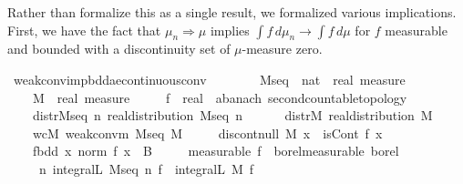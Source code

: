 \documentclass[leqno]{article}
\theoremstyle{definition}
\begin{document}
Rather than formalize this as a single result, we formalized various implications. First, we have the fact that $\mu_n \Rightarrow \mu$ implies $\int f \, d\mu_n \rightarrow \int f \, d\mu$ for $f$ measurable and bounded with a discontinuity set of $\mu$-measure zero.

\medskip

\begin{isabellebody}
\isamarkupfalse%
\ weak{\isacharunderscore}conv{\isacharunderscore}imp{\isacharunderscore}bdd{\isacharunderscore}ae{\isacharunderscore}continuous{\isacharunderscore}conv{\isacharcolon}\isanewline
\ \ \ \isanewline
\ \ \ \ M{\isacharunderscore}seq\ {\isacharcolon}{\isacharcolon}\ {\isachardoublequoteopen}nat\ {\isasymRightarrow}\ real\ measure{\isachardoublequoteclose}\ \isanewline
\ \ \ \ M\ {\isacharcolon}{\isacharcolon}\ {\isachardoublequoteopen}real\ measure{\isachardoublequoteclose}\ \isanewline
\ \ \ \ f\ {\isacharcolon}{\isacharcolon}\ {\isachardoublequoteopen}real\ {\isasymRightarrow}\ {\isacharprime}a{\isacharcolon}{\isacharcolon}{\isacharbraceleft}banach{\isacharcomma}\ second{\isacharunderscore}countable{\isacharunderscore}topology{\isacharbraceright}{\isachardoublequoteclose}\isanewline
\ \ \ \isanewline
\ \ \ \ distr{\isacharunderscore}M{\isacharunderscore}seq{\isacharcolon}\ {\isachardoublequoteopen}{\isasymAnd}n{\isachardot}\ real{\isacharunderscore}distribution\ {\isacharparenleft}M{\isacharunderscore}seq\ n{\isacharparenright}{\isachardoublequoteclose}\ \ \isanewline
\ \ \ \ distr{\isacharunderscore}M{\isacharcolon}\ {\isachardoublequoteopen}real{\isacharunderscore}distribution\ M{\isachardoublequoteclose}\ \ \isanewline
\ \ \ \ wcM{\isacharcolon}\ {\isachardoublequoteopen}weak{\isacharunderscore}conv{\isacharunderscore}m\ M{\isacharunderscore}seq\ M{\isachardoublequoteclose}\ \isanewline
\ \ \ \ discont{\isacharunderscore}null{\isacharcolon}\ {\isachardoublequoteopen}M\ {\isacharparenleft}{\isacharbraceleft}x{\isachardot}\ {\isasymnot}\ isCont\ f\ x{\isacharbraceright}{\isacharparenright}\ {\isacharequal}\ {}{\isachardoublequoteclose}\ \isanewline
\ \ \ \ f{\isacharunderscore}bdd{\isacharcolon}\ {\isachardoublequoteopen}{\isasymAnd}x{\isachardot}\ norm\ {\isacharparenleft}f\ x{\isacharparenright}\ {\isasymle}\ B{\isachardoublequoteclose}\ \isanewline
\ \ \ \ {\isacharbrackleft}measurable{\isacharbrackright}{\isacharcolon}\ {\isachardoublequoteopen}f\ {\isasymin}\ borel{\isacharunderscore}measurable\ borel{\isachardoublequoteclose}\isanewline
\ \ \ \isanewline
\ \ \ \ {\isachardoublequoteopen}{\isacharparenleft}{\isasymlambda}\ n{\isachardot}\ integral\isactrlsup L\ {\isacharparenleft}M{\isacharunderscore}seq\ n{\isacharparenright}\ f{\isacharparenright}\ {\isacharminus}{\isacharminus}{\isacharminus}{\isacharminus}{\isachargreater}\ integral\isactrlsup L\ M\ f{\isachardoublequoteclose}
\end{isabellebody}
\end{document}

